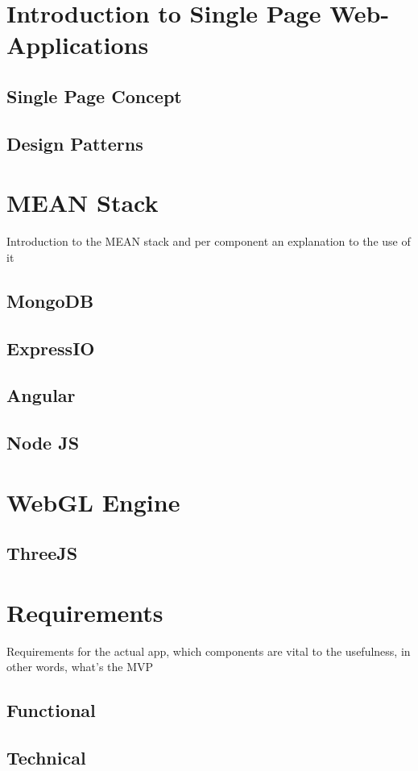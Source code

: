 \documentclass[signatures]{Thesis}
\begin{document}
	\section{Introduction to Single Page Web-Applications}
		\subsection{Single Page Concept}
		\subsection{Design Patterns}
	\section{MEAN Stack}
		Introduction to the MEAN stack and per component an explanation to the use of it
		\subsection{MongoDB}
		\subsection{ExpressIO}
		\subsection{Angular}
		\subsection{Node JS}
	\section{WebGL Engine}
		\subsection{ThreeJS}
	\section{Requirements}
		Requirements for the actual app, which components are vital to the usefulness, in other words, what's the MVP
		\subsection{Functional}
		\subsection{Technical}
\end{document}

